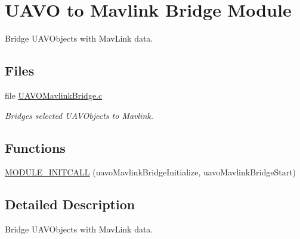 \hypertarget{group___u_a_v_o_mavlink_bridge}{\section{U\-A\-V\-O to Mavlink Bridge Module}
\label{group___u_a_v_o_mavlink_bridge}
}


Bridge U\-A\-V\-Objects with Mav\-Link data.  


\subsection*{Files}
\begin{DoxyCompactItemize}
\item 
file \hyperlink{_u_a_v_o_mavlink_bridge_8c}{U\-A\-V\-O\-Mavlink\-Bridge.\-c}
\begin{DoxyCompactList}\small\item\em Bridges selected U\-A\-V\-Objects to Mavlink. \end{DoxyCompactList}\end{DoxyCompactItemize}
\subsection*{Functions}
\begin{DoxyCompactItemize}
\item 
\hyperlink{group___u_a_v_o_mavlink_bridge_gaf0a82e8a31bd9af162ebc4465973faf4}{M\-O\-D\-U\-L\-E\-\_\-\-I\-N\-I\-T\-C\-A\-L\-L} (uavo\-Mavlink\-Bridge\-Initialize, uavo\-Mavlink\-Bridge\-Start)
\end{DoxyCompactItemize}


\subsection{Detailed Description}
Bridge U\-A\-V\-Objects with Mav\-Link data. 


